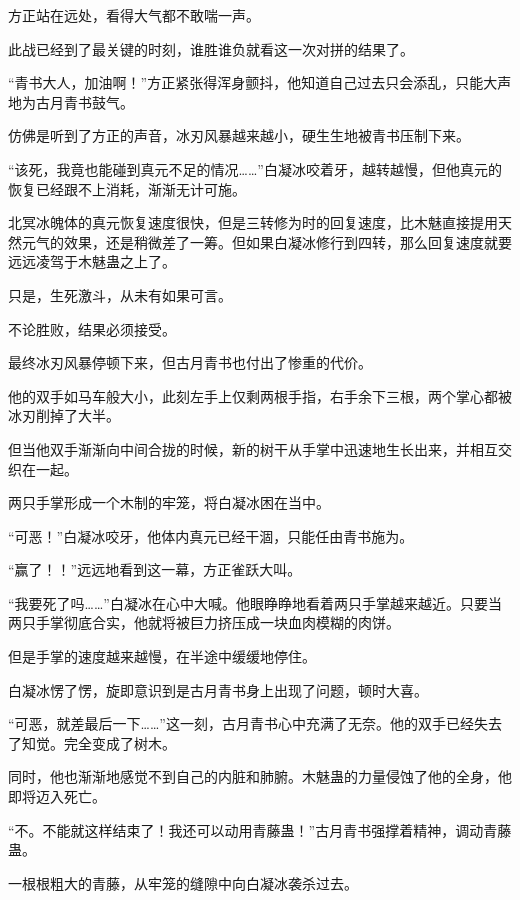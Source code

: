 
\begin{this_body}

方正站在远处，看得大气都不敢喘一声。

此战已经到了最关键的时刻，谁胜谁负就看这一次对拼的结果了。

“青书大人，加油啊！”方正紧张得浑身颤抖，他知道自己过去只会添乱，只能大声地为古月青书鼓气。

仿佛是听到了方正的声音，冰刃风暴越来越小，硬生生地被青书压制下来。

“该死，我竟也能碰到真元不足的情况……”白凝冰咬着牙，越转越慢，但他真元的恢复已经跟不上消耗，渐渐无计可施。

北冥冰魄体的真元恢复速度很快，但是三转修为时的回复速度，比木魅直接提用天然元气的效果，还是稍微差了一筹。但如果白凝冰修行到四转，那么回复速度就要远远凌驾于木魅蛊之上了。

只是，生死激斗，从未有如果可言。

不论胜败，结果必须接受。

最终冰刃风暴停顿下来，但古月青书也付出了惨重的代价。

他的双手如马车般大小，此刻左手上仅剩两根手指，右手余下三根，两个掌心都被冰刃削掉了大半。

但当他双手渐渐向中间合拢的时候，新的树干从手掌中迅速地生长出来，并相互交织在一起。

两只手掌形成一个木制的牢笼，将白凝冰困在当中。

“可恶！”白凝冰咬牙，他体内真元已经干涸，只能任由青书施为。

“赢了！！”远远地看到这一幕，方正雀跃大叫。

“我要死了吗……”白凝冰在心中大喊。他眼睁睁地看着两只手掌越来越近。只要当两只手掌彻底合实，他就将被巨力挤压成一块血肉模糊的肉饼。

但是手掌的速度越来越慢，在半途中缓缓地停住。

白凝冰愣了愣，旋即意识到是古月青书身上出现了问题，顿时大喜。

“可恶，就差最后一下……”这一刻，古月青书心中充满了无奈。他的双手已经失去了知觉。完全变成了树木。

同时，他也渐渐地感觉不到自己的内脏和肺腑。木魅蛊的力量侵蚀了他的全身，他即将迈入死亡。

“不。不能就这样结束了！我还可以动用青藤蛊！”古月青书强撑着精神，调动青藤蛊。

一根根粗大的青藤，从牢笼的缝隙中向白凝冰袭杀过去。


\end{this_body}
